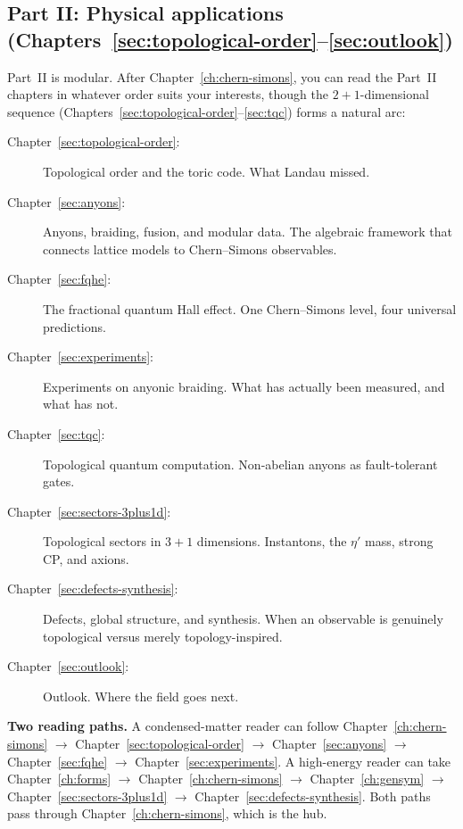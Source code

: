 \subsection*{Part II: Physical applications (Chapters~\ref{sec:topological-order}--\ref{sec:outlook})}

Part~II is modular.  After Chapter~\ref{ch:chern-simons}, you can read the Part~II chapters in whatever order suits your interests, though the $2{+}1$-dimensional sequence (Chapters~\ref{sec:topological-order}--\ref{sec:tqc}) forms a natural arc:

\begin{description}
\item[Chapter~\ref{sec:topological-order}:]  Topological order and the toric code.  What Landau missed.

\item[Chapter~\ref{sec:anyons}:]  Anyons, braiding, fusion, and modular data.  The algebraic framework that connects lattice models to Chern--Simons observables.

\item[Chapter~\ref{sec:fqhe}:]  The fractional quantum Hall effect.  One Chern--Simons level, four universal predictions.

\item[Chapter~\ref{sec:experiments}:]  Experiments on anyonic braiding.  What has actually been measured, and what has not.

\item[Chapter~\ref{sec:tqc}:]  Topological quantum computation.  Non-abelian anyons as fault-tolerant gates.

\item[Chapter~\ref{sec:sectors-3plus1d}:]  Topological sectors in $3{+}1$ dimensions.  Instantons, the $\eta'$ mass, strong CP, and axions.

\item[Chapter~\ref{sec:defects-synthesis}:]  Defects, global structure, and synthesis.  When an observable is genuinely topological versus merely topology-inspired.

\item[Chapter~\ref{sec:outlook}:]  Outlook.  Where the field goes next.
\end{description}

\medskip
\noindent \textbf{Two reading paths.}  A condensed-matter reader can follow Chapter~\ref{ch:chern-simons} $\to$ Chapter~\ref{sec:topological-order} $\to$ Chapter~\ref{sec:anyons} $\to$ Chapter~\ref{sec:fqhe} $\to$ Chapter~\ref{sec:experiments}.  A high-energy reader can take Chapter~\ref{ch:forms} $\to$ Chapter~\ref{ch:chern-simons} $\to$ Chapter~\ref{ch:gensym} $\to$ Chapter~\ref{sec:sectors-3plus1d} $\to$ Chapter~\ref{sec:defects-synthesis}.  Both paths pass through Chapter~\ref{ch:chern-simons}, which is the hub.


